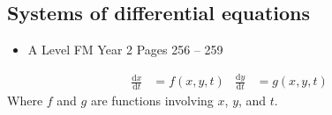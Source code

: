 \documentclass[11pt, a4paper]{article}
\begin{document}
\subsection{Systems of differential equations}
\begin{itemize}
\item A Level FM Year 2 \hspace{1cm} \phantom{AS /} Pages 256 -- 259
\end{itemize} \par
\begin{align*}
\frac{\mathrm{d}x}{\mathrm{d}t}&=f(x,y,t) & \frac{\mathrm{d}y}{\mathrm{d}t}&=g(x,y,t)
\end{align*}
Where $f$ and $g$ are functions involving $x$, $y$, and $t$. \newline \par
\end{document}
